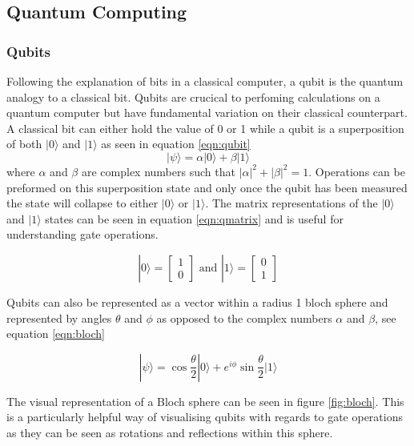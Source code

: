 \subsection{Quantum Computing}
\subsubsection{Qubits}
Following the explanation of bits in a classical computer, a qubit is the quantum analogy to a classical bit. Qubits are crucical to perfoming calculations on a quantum computer but have fundamental variation on their classical counterpart.
A classical bit can either hold the value of 0 or 1 while a qubit is a superposition of both $|0\rangle$ and $|1\rangle$ as seen in equation \ref{eqn:qubit}
\begin{equation}\label{eqn:qubit}
    |\psi\rangle = \alpha|0\rangle + \beta|1\rangle
\end{equation}
where $\alpha$ and $\beta$ are complex numbers such that $|\alpha|^2 + |\beta|^2 = 1$.
Operations can be preformed on this superposition state and only once the qubit has been measured the state will collapse to either $|0\rangle$ or $|1\rangle$. \cite{nielsen_quantum_2010}
The matrix representations of the $|0\rangle$ and $|1\rangle$ states can be seen in equation \ref{eqn:qmatrix} and is useful for understanding gate operations.

\begin{equation}\label{eqn:qmatrix}
    |0\rangle = \begin{bmatrix}
1 \\
0 
\end{bmatrix} \text{ and } |1\rangle = \begin{bmatrix}
0 \\
1 
\end{bmatrix}  
\end{equation}

Qubits can also be represented as a vector within a radius 1 bloch sphere and represented by angles $\theta$ and $\phi$ as opposed to the complex numbers $\alpha$ and $\beta$, see equation \ref{eqn:bloch}

\begin{equation}\label{eqn:bloch}
    |\psi \rangle = \cos \frac{\theta}{2}|0\rangle + e^{i \phi}\sin \frac{\theta}{2} |1\rangle
\end{equation}

The visual representation of a Bloch sphere can be seen in figure \ref{fig:bloch}.
This is a particularly helpful way of visualising qubits with regards to gate operations as they can be seen as rotations and reflections within this sphere. \cite{noauthor_representing_nodate}



